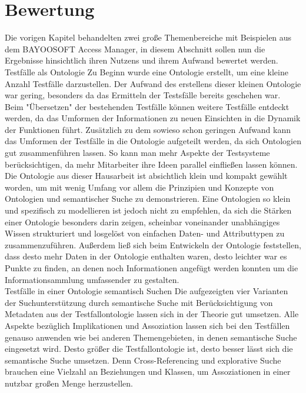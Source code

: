 \section{Bewertung}
Die vorigen Kapitel behandelten zwei große Themenbereiche mit Beispielen aus dem BAYOOSOFT Access Manager, in diesem Abschnitt sollen nun die Ergebnisse hinsichtlich ihren Nutzens und ihrem Aufwand bewertet werden. \\

Testfälle als Ontologie\newline
Zu Beginn wurde eine Ontologie erstellt, um eine kleine Anzahl Testfälle darzustellen. Der Aufwand des erstellens dieser kleinen Ontologie war gering, besonders da das Ermitteln der Testsfälle bereits geschehen war. Beim "Übersetzen" der bestehenden Testfälle können weitere Testfälle entdeckt werden, da das Umformen der Informationen zu neuen Einsichten in die Dynamik der Funktionen führt. Zusätzlich zu dem sowieso schon geringen Aufwand kann das Umformen der Testfälle in die Ontologie aufgeteilt werden, da sich Ontologien gut zusammenführen lassen. So kann man mehr Aspekte der Testsysteme berücksichtigen, da mehr Mitarbeiter ihre Ideen parallel einfließen lassen können. Die Ontologie aus dieser Hausarbeit ist absichtlich klein und kompakt gewählt worden, um mit wenig Umfang vor allem die Prinzipien und Konzepte von Ontologien und semantischer Suche zu demonstrieren. Eine Ontologien so klein und spezifisch zu modellieren ist jedoch nicht zu empfehlen, da sich die Stärken einer Ontologie besonders darin zeigen, scheinbar voneinander unabhängiges Wissen strukturiert und losgelöst von einfachen Daten- und Attributtypen zu zusammenzuführen. Außerdem ließ sich beim Entwickeln der Ontologie feststellen, dass desto mehr Daten in der Ontologie enthalten waren, desto leichter war es Punkte zu finden, an denen noch Informationen angefügt werden konnten um die Informationsammlung umfassender zu gestalten. \\

Testfälle in einer Ontologie semantisch Suchen\newline
Die aufgezeigten vier Varianten der Suchunterstützung durch semantische Suche mit Berücksichtigung von Metadaten aus der Testfallontologie lassen sich in der Theorie gut umsetzen. Alle Aspekte bezüglich Implikationen und Assoziation lassen sich bei den Testfällen genauso anwenden wie bei anderen Themengebieten, in denen semantische Suche eingesetzt wird. Desto größer die Testfallontologie ist, desto besser lässt sich die semantische Suche umsetzen. Denn Cross-Referencing und explorative Suche brauchen eine Vielzahl an Beziehungen und Klassen, um Assoziationen in einer nutzbar großen Menge herzustellen. 

